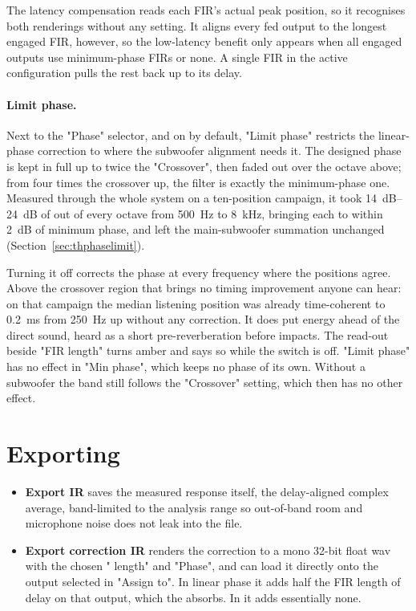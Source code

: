 \noindent The latency compensation reads each FIR's actual peak position, so it recognises both renderings without any setting. It aligns every fed output to the longest engaged FIR, however, so the low-latency benefit only appears when all engaged outputs use minimum-phase FIRs or none. A single  FIR in the active configuration pulls the rest back up to its delay.

\paragraph{Limit phase.} Next to the "Phase" selector, and on by default, "Limit phase" restricts the linear-phase correction to where the subwoofer alignment needs it. The designed phase is kept in full up to twice the "Crossover", then faded out over the octave above; from four times the crossover up, the filter is exactly the minimum-phase one. Measured through the whole system on a ten-position campaign, it took \SIrange{14}{24}{\dB} of  out of every octave from \SI{500}{\hertz} to \SI{8}{\kilo\hertz}, bringing each to within \SI{2}{\dB} of minimum phase, and left the main-subwoofer summation unchanged (Section~\ref{sec:thphaselimit}).

Turning it off corrects the phase at every frequency where the positions agree. Above the crossover region that brings no timing improvement anyone can hear: on that campaign the median listening position was already time-coherent to \SI{0.2}{\milli\second} from \SI{250}{\hertz} up without any correction. It does put energy ahead of the direct sound, heard as a short pre-reverberation before impacts. The read-out beside "FIR length" turns amber and says so while the switch is off. "Limit phase" has no effect in "Min phase", which keeps no phase of its own. Without a subwoofer the band still follows the "Crossover" setting, which then has no other effect.

\section{Exporting}
\begin{itemize}[nosep]
  \item \textbf{Export IR} saves the measured response itself, the delay-aligned complex average, band-limited to the analysis range so out-of-band room and microphone noise does not leak into the file.
  \item \textbf{Export correction IR} renders the correction to a mono 32-bit float wav with the chosen " length" and "Phase", and can load it directly onto the output selected in "Assign to". In linear phase it adds half the FIR length of delay on that output, which the  absorbs. In  it adds essentially none.
\end{itemize}
